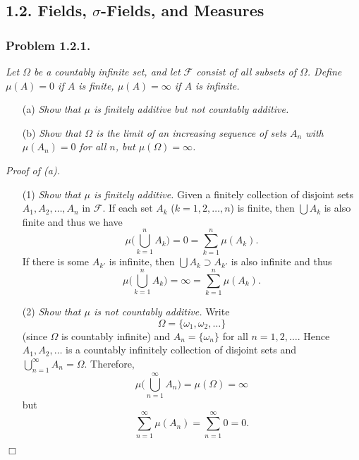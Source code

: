 \documentclass{article}
\begin{document}
\subsection*{1.2. Fields, $\sigma$-Fields, and Measures \\}






\subsubsection*{Problem 1.2.1.}
\emph{Let $\Omega$ be a countably infinite set,
and let $\mathscr{F}$ consist of all subsets of $\Omega$.
Define $\mu(A) = 0$ if $A$ is finite, $\mu(A) = \infty$ if $A$ is infinite.}
\begin{enumerate}
\item[(a)]
  \emph{Show that $\mu$ is finitely additive but not countably additive.}

\item[(b)]
  \emph{Show that $\Omega$ is the limit of an increasing sequence of sets $A_n$
  with $\mu(A_n) = 0$ for all $n$, but $\mu(\Omega) = \infty$.} \\
\end{enumerate}



\emph{Proof of (a).}
\begin{enumerate}
\item[(1)]
  \emph{Show that $\mu$ is finitely additive.}
  Given a finitely collection of disjoint sets $A_1, A_2, \ldots, A_n$ in $\mathscr{F}$.
  If each set $A_k$ ($k = 1, 2, \ldots, n$) is finite,
  then $\bigcup A_k$ is also finite and thus we have
  \[
    \mu \Bigg( \bigcup_{k=1}^{n} A_k \Bigg)
    = 0
    = \sum_{k=1}^{n} \mu(A_k).
  \]
  If there is some $A_{k'}$ is infinite,
  then $\bigcup A_k \supset A_{k'}$ is also infinite and thus
  \[
    \mu \Bigg( \bigcup_{k=1}^{n} A_k \Bigg)
    = \infty
    = \sum_{k=1}^{n} \mu(A_k).
  \]

\item[(2)]
  \emph{Show that $\mu$ is not countably additive.}
  Write
  \[
    \Omega = \{ \omega_1, \omega_2, \ldots \}
  \]
  (since $\Omega$ is countably infinite) and
  $A_n = \{ \omega_n \}$ for all $n = 1, 2, \ldots$.
  Hence $A_1, A_2, \ldots$ is a countably infinitely collection of disjoint sets
  and $\bigcup_{n=1}^{\infty} A_n = \Omega$.
  Therefore,
  \[
    \mu \Bigg( \bigcup_{n=1}^{\infty} A_n \Bigg)
    = \mu(\Omega)
    = \infty
  \]
  but
  \[
    \sum_{n=1}^{\infty} \mu(A_n)
    = \sum_{n=1}^{\infty} 0
    = 0.
  \]
\end{enumerate}
$\Box$ \\\\
\end{document}
